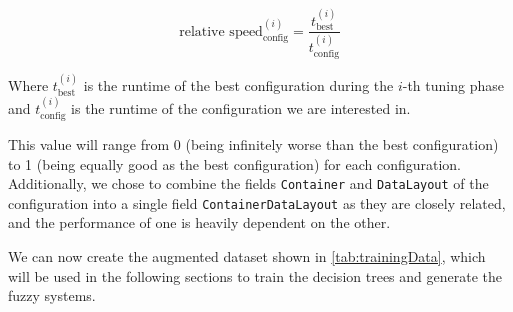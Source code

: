 \begin{equation}
    {\text{relative speed}^{(i)}_{\text{config}}}= \frac{t_{\text{best}}^{(i)}}{t_{\text{config}}^{(i)}}
\end{equation}

Where $t_{\text{best}}^{(i)}$ is the runtime of the best configuration during the $i$-th tuning phase and $t_{\text{config}}^{(i)}$ is the runtime of the configuration we are interested in.

This value will range from 0 (being infinitely worse than the best configuration) to 1 (being equally good as the best configuration) for each configuration. Additionally, we chose to combine the fields \texttt{Container} and \texttt{DataLayout} of the configuration into a single field \texttt{ContainerDataLayout} as they are closely related, and the performance of one is heavily dependent on the other.

We can now create the augmented dataset shown in \autoref{tab:trainingData}, which will be used in the following sections to train the decision trees and generate the fuzzy systems.



